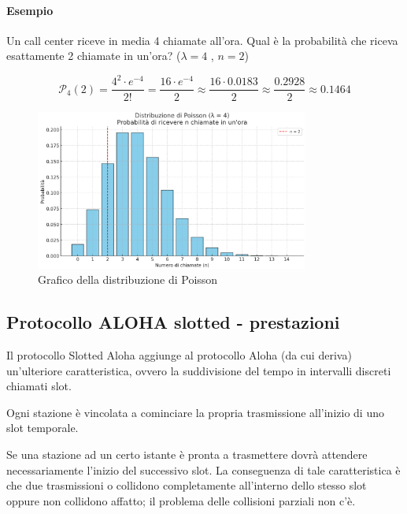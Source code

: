 \paragraph{Esempio} Un call center riceve in media 4 chiamate all'ora. Qual è la probabilità che riceva esattamente 2 chiamate in un'ora? ($\lambda = 4$ , $n = 2$)

\begin{equation*}
\mathcal{P}_4(2) = \frac{4^2 \cdot e^{-4}}{2!} = \frac{16 \cdot e^{-4}}{2} \approx \frac{16 \cdot 0.0183}{2} \approx \frac{0.2928}{2} \approx 0.1464
\end{equation*}

\begin{figure}[h!]
    \centering
    \includegraphics[width=0.8\textwidth]{images/poissongrafico.png}
    \caption{Grafico della distribuzione di Poisson}
    \label{fig:poisson_grafico}
\end{figure}

\newpage

\subsection{Protocollo ALOHA slotted - prestazioni}

Il protocollo Slotted Aloha aggiunge al protocollo Aloha (da cui deriva) un'ulteriore caratteristica, ovvero la suddivisione del tempo in intervalli discreti chiamati slot. 

Ogni stazione è vincolata a cominciare la propria trasmissione all'inizio di uno slot temporale.

Se una stazione ad un certo istante è pronta a trasmettere dovrà attendere necessariamente l'inizio del successivo slot. La conseguenza di tale caratteristica è che due trasmissioni o collidono completamente all'interno dello stesso slot oppure non collidono affatto; il problema delle collisioni parziali non c'è.


